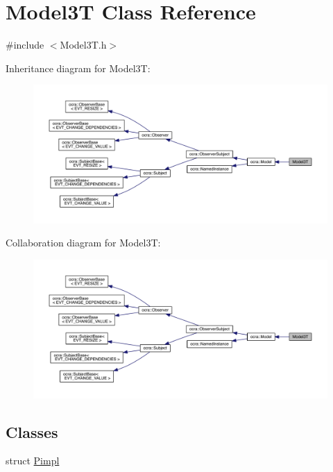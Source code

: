 \hypertarget{classModel3T}{}\section{Model3T Class Reference}
\label{classModel3T}


{\ttfamily \#include $<$Model3\+T.\+h$>$}



Inheritance diagram for Model3T\+:\nopagebreak
\begin{figure}[H]
\begin{center}
\leavevmode
\includegraphics[width=350pt]{da/dd6/classModel3T__inherit__graph}
\end{center}
\end{figure}


Collaboration diagram for Model3T\+:\nopagebreak
\begin{figure}[H]
\begin{center}
\leavevmode
\includegraphics[width=350pt]{dd/d8d/classModel3T__coll__graph}
\end{center}
\end{figure}
\subsection*{Classes}
\begin{DoxyCompactItemize}
\item 
struct \hyperlink{structModel3T_1_1Pimpl}{Pimpl}
\end{DoxyCompactItemize}
